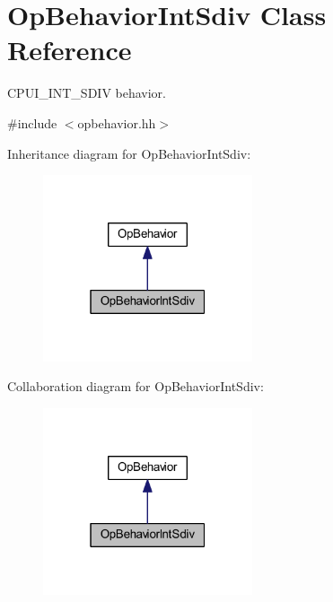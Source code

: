 \hypertarget{class_op_behavior_int_sdiv}{}\section{Op\+Behavior\+Int\+Sdiv Class Reference}
\label{class_op_behavior_int_sdiv}


C\+P\+U\+I\+\_\+\+I\+N\+T\+\_\+\+S\+D\+IV behavior.  




{\ttfamily \#include $<$opbehavior.\+hh$>$}



Inheritance diagram for Op\+Behavior\+Int\+Sdiv\+:
\nopagebreak
\begin{figure}[H]
\begin{center}
\leavevmode
\includegraphics[width=175pt]{class_op_behavior_int_sdiv__inherit__graph}
\end{center}
\end{figure}


Collaboration diagram for Op\+Behavior\+Int\+Sdiv\+:
\nopagebreak
\begin{figure}[H]
\begin{center}
\leavevmode
\includegraphics[width=175pt]{class_op_behavior_int_sdiv__coll__graph}
\end{center}
\end{figure}
